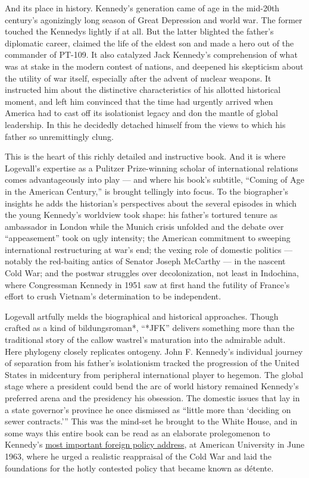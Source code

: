 And its place in history. Kennedy's generation came of age in the
mid-20th century's agonizingly long season of Great Depression and world
war. The former touched the Kennedys lightly if at all. But the latter
blighted the father's diplomatic career, claimed the life of the eldest
son and made a hero out of the commander of PT-109. It also catalyzed
Jack Kennedy's comprehension of what was at stake in the modern contest
of nations, and deepened his skepticism about the utility of war itself,
especially after the advent of nuclear weapons. It instructed him about
the distinctive characteristics of his allotted historical moment, and
left him convinced that the time had urgently arrived when America had
to cast off its isolationist legacy and don the mantle of global
leadership. In this he decidedly detached himself from the views to
which his father so unremittingly clung.

This is the heart of this richly detailed and instructive book. And it
is where Logevall's expertise as a Pulitzer Prize-winning scholar of
international relations comes advantageously into play --- and where his
book's subtitle, ``Coming of Age in the American Century,'' is brought
tellingly into focus. To the biographer's insights he adds the
historian's perspectives about the several episodes in which the young
Kennedy's worldview took shape: his father's tortured tenure as
ambassador in London while the Munich crisis unfolded and the debate
over ``appeasement'' took on ugly intensity; the American commitment to
sweeping international restructuring at war's end; the vexing role of
domestic politics --- notably the red-baiting antics of Senator Joseph
McCarthy --- in the nascent Cold War; and the postwar struggles over
decolonization, not least in Indochina, where Congressman Kennedy in
1951 saw at first hand the futility of France's effort to crush
Vietnam's determination to be independent.

Logevall artfully melds the biographical and historical approaches.
Though crafted as a kind of bildungsroman*, ``*JFK'' delivers something
more than the traditional story of the callow wastrel's maturation into
the admirable adult. Here phylogeny closely replicates ontogeny. John F.
Kennedy's individual journey of separation from his father's
isolationism tracked the progression of the United States in midcentury
from peripheral international player to hegemon. The global stage where
a president could bend the arc of world history remained Kennedy's
preferred arena and the presidency his obsession. The domestic issues
that lay in a state governor's province he once dismissed as ``little
more than `deciding on sewer contracts.''' This was the mind-set he
brought to the White House, and in some ways this entire book can be
read as an elaborate prolegomenon to Kennedy's
\href{https://www.jfklibrary.org/archives/other-resources/john-f-kennedy-speeches/american-university-19630610}{most
important foreign policy address}, at American University in June 1963,
where he urged a realistic reappraisal of the Cold War and laid the
foundations for the hotly contested policy that became known as détente.

